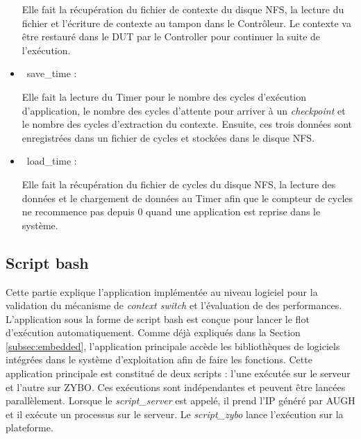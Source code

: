 \begin{itemize}
	Elle fait la récupération du fichier de contexte du disque NFS, la lecture du fichier et l'écriture de contexte
	au tampon dans le Contrôleur.
	Le contexte va être restauré dans le DUT par le Controller pour continuer la suite de l'exécution.
	
	\item\
	save\_time :
	
	Elle fait la lecture du Timer pour le nombre des cycles d'exécution d'application, le nombre des cycles d'attente pour arriver à un \emph{checkpoint}
	et le nombre des cycles d'extraction du contexte. Ensuite, ces trois données sont enregistrées dans un
	fichier de cycles et stockées dans le disque NFS.
	
	\item\
	load\_time :
	
	Elle fait la récupération du fichier de cycles du disque NFS, la lecture des données et le chargement de
	données au Timer afin que le compteur de cycles ne recommence pas depuis 0 quand une application
	est reprise dans le système.

\end{itemize}

\subsection{Script bash} %
Cette partie explique l'application implémentée au niveau logiciel pour la validation du
mécanisme de \emph{context switch} et l'évaluation de des performances.
L'application sous la forme de script bash est conçue pour lancer le flot d'exécution automatiquement. 
Comme déjà expliqués dans la Section \ref{subsec:embedded}, l'application principale accède les
bibliothèques de logiciels intégrées dans le système d'exploitation afin de faire les fonctions.
Cette application principale est constitué de deux scripts : l'une exécutée sur le serveur et l'autre
sur ZYBO. Ces exécutions sont indépendantes et peuvent être
lancées parallèlement. Lorsque le \emph{script\_server} est appelé, il prend
l'IP généré par AUGH et il exécute un processus sur le serveur. Le \emph{script\_zybo}
lance l'exécution sur la plateforme.

